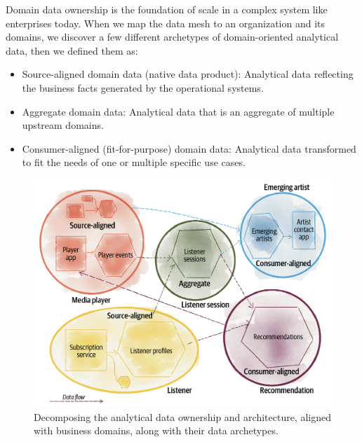 \documentclass[12pt, a4paper]{book}
\begin{document}
Domain data ownership is the foundation of scale in a complex system like enterprises today. When we map the data mesh to an organization and its domains, we discover a few different archetypes of domain-oriented analytical data, then we defined them as:
	\begin{itemize}
		\item Source-aligned domain data (native data product): Analytical data reflecting the business facts generated by the operational systems.
		\item Aggregate domain data: Analytical data that is an aggregate of multiple upstream domains.
		\item Consumer-aligned (fit-for-purpose) domain data: Analytical data transformed to fit the needs of one or multiple specific use cases.
	\end{itemize}

\begin{figure}[h]
	\centering
	\includegraphics[width=12cm]{DecomposeData.png}
	\caption{Decomposing the analytical data ownership and architecture, aligned with business domains, along with their data archetypes.}
	\label{DecomposeData}
\end{figure}
\end{document}
